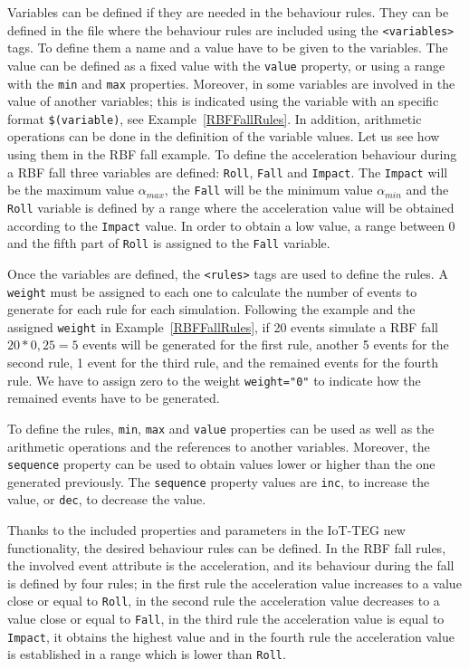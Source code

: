 \documentclass[conference]{IEEEtran}
\theoremstyle{definition}
\begin{document}
Variables can be defined if they are needed in the behaviour rules. They can be defined in the file where
the behaviour rules are included using the \texttt{<variables>} tags. To define them a name and a value 
have to be given to the variables. The value can be defined as a fixed value with the \texttt{value} 
property, or using a range with the \texttt{min} and \texttt{max} properties. Moreover, in some variables
are involved in the value of another variables; this is indicated using the variable with an specific 
format \texttt{\$(variable)}, see Example~\ref{RBFFallRules}. In addition, arithmetic operations can be 
done in the definition of the variable values. Let us see how using them in the RBF fall example. To 
define the acceleration behaviour during a RBF fall three variables are defined: \texttt{Roll}, 
\texttt{Fall} and \texttt{Impact}. The \texttt{Impact} will be the maximum value $\alpha_{max}$, the 
\texttt{Fall} will be the minimum value $\alpha_{min}$ and the \texttt{Roll} variable is defined by a 
range where the acceleration value will be obtained according to the \texttt{Impact} value. In order to
obtain a low value, a range between 0 and the fifth part of \texttt{Roll} is assigned to the \texttt{Fall} 
variable.

Once the variables are defined, the \texttt{<rules>} tags are used to define the rules. A \texttt{weight}
must be assigned to each one to calculate the number of events to generate for each rule for each simulation.
Following the example and the assigned \texttt{weight} in Example~\ref{RBFFallRules}, if 20 events simulate 
a RBF fall $20 * 0,25 = 5$ events will be generated for the first rule, another 5 events for the second rule,
1 event for the third rule, and the remained events for the fourth rule. We have to assign zero to the weight
\texttt{weight="0"} to indicate how the remained events have to be generated.

To define the rules, \texttt{min}, \texttt{max} and \texttt{value} properties can be used as well as the arithmetic 
operations and the references to another variables. Moreover, the \texttt{sequence} property can be used to obtain
values lower or higher than the one generated previously. The \texttt{sequence} property values are \texttt{inc}, 
to increase the value, or \texttt{dec}, to decrease the value.

Thanks to the included properties and parameters in the IoT-TEG new functionality, the desired behaviour rules can
be defined. In the RBF fall rules, the involved event attribute is the acceleration, and its behaviour during the 
fall is defined by four rules; in the first rule the acceleration value increases to a value close or equal to \texttt{Roll},
in the second rule the acceleration value decreases to a value close or equal to \texttt{Fall}, in the third rule the 
acceleration value is equal to \texttt{Impact}, it obtains the highest value and in the fourth rule the acceleration value
is established in a range which is lower than \texttt{Roll}.
\end{document}
